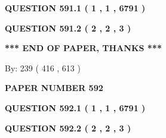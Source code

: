 \documentclass[12pt]{article}
\begin{document}
 
 
 
   
   
  
\vspace{0.2in}
  
{\textbf{\Large{QUESTION
591.1 
 ( 1 , 1 , 6791 )
}}}
  
  
  
\vspace{0.2in}
  
{\textbf{\Large{QUESTION
591.2 
 ( 2 , 2 , 3 )
}}}
  
  
   
   
 \vspace{0.2in}
 
   
   
   
   
\vspace{1.0in} 
{\textbf{\large{ *** END OF PAPER, THANKS *** }}} 
   
   
\hspace{1.0in} By: 
 239 ( 416 ,  613 )
   
   
   
   
\newpage 
\setcounter{page}{ 
   592001 } 
   
   
   
   
 {\textbf{ \Large{ PAPER NUMBER  592  }}}
   
   
\vspace{0.2in}
   
   
   
   
   
   
 \vspace{0.2in}
 
 
 
 
   
   
  
\vspace{0.2in}
  
{\textbf{\Large{QUESTION
592.1 
 ( 1 , 1 , 6791 )
}}}
  
  
  
\vspace{0.2in}
  
{\textbf{\Large{QUESTION
592.2 
 ( 2 , 2 , 3 )
}}}
  
  
   
   
 \vspace{0.2in}
 
   
   
   
   
\end{document}
